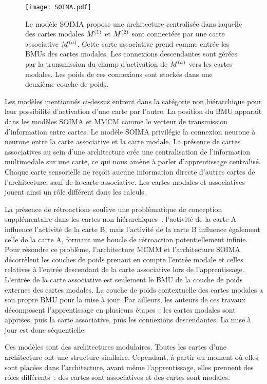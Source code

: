 \documentclass[../main]{subfiles}
\begin{document}
\begin{figure}[t]
    \centering
    \texttt{[image: SOIMA.pdf]}
    \caption{Le modèle SOIMA \cite{escobar-juarez_self-organized_2016} propose une architecture centralisée dans laquelle des cartes modales $M^{({1})}$ et $M^{({2})}$ sont connectées par une carte associative $M^{({a})}$. Cette carte associative prend comme entrée les BMUs des cartes modales. 
    Les connexions descendantes sont gérées par la transmission du champ d'activation de $M^{({a})}$ vers les cartes modales. Les poids de ces connexions sont stockés dans une deuxième couche de poids.
    \label{fig:SOIMA}}
\end{figure}

Les modèles mentionnés ci-dessus entrent dans la catégorie non hiérarchique pour leur possibilité d'activation d'une carte par l'autre. 
La position du BMU apparaît dans les modèles SOIMA et MMCM comme le vecteur de transmission d'information  entre cartes.
Le modèle SOIMA privilégie la connexion neurone à neurone entre la carte associative et la carte modale.
La présence de cartes associatives au sein d'une architecture crée une centralisation de l'information multimodale sur une carte, ce qui nous amène à parler d'apprentissage centralisé. Chaque carte sensorielle ne reçoit aucune information directe d'autres cartes de l'architecture, sauf de la carte associative.
Les cartes modales et associatives jouent ainsi un rôle différent dans les calculs.

La présence de rétroactions soulève une problématique de conception supplémentaire dans les cartes non hiérarchiques~: l'activité de la carte A influence l'activité de la carte B, mais l'activité de la carte B influence également celle de la carte A, formant une boucle de rétroaction potentiellement infinie. 
Pour résoudre ce problème, l'architecture MCMM et l'architecture SOIMA décorrèlent les couches de poids prenant en compte l'entrée modale et celles relatives à l'entrée descendant de la carte associative lors de l'apprentissage.
L'entrée de la carte associative est seulement le BMU de la couche de poids externes des cartes modales. La couche de poids contextuelle des cartes modales a son propre BMU pour la mise à jour. 
Par ailleurs, les auteurs de ces travaux décomposent l'apprentissage en plusieurs étapes~: les cartes modales sont apprises, puis la carte associative, puis les connexions descendantes. La mise à jour est donc séquentielle.

Ces modèles sont des architectures modulaires. Toutes les cartes d'une architecture ont une structure similaire. Cependant, à partir du moment où elles sont placées dans l'architecture, avant même l'apprentissage, elles prennent des rôles différents~: des cartes sont associatives et des cartes sont modales. 
\end{document}
